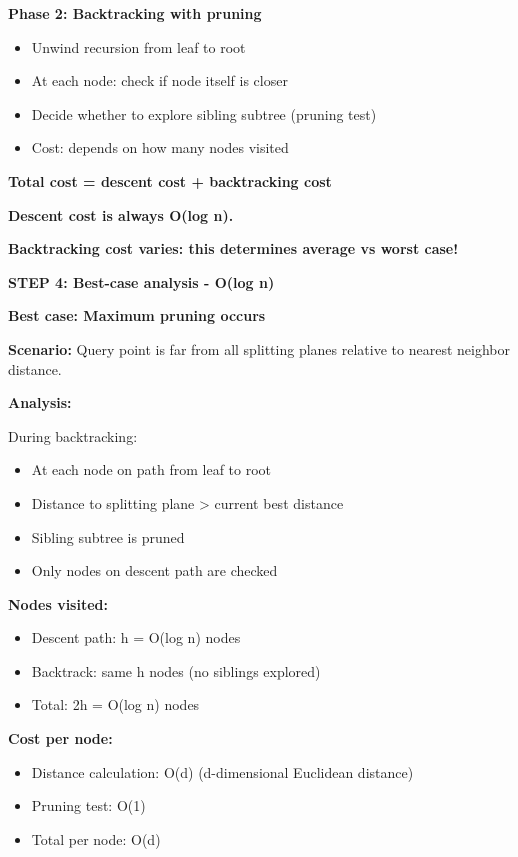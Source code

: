 \documentclass[12pt]{article}
\begin{document}
\begin{solution}
\textbf{Phase 2: Backtracking with pruning}
\begin{itemize}
    \item Unwind recursion from leaf to root
    \item At each node: check if node itself is closer
    \item Decide whether to explore sibling subtree (pruning test)
    \item Cost: depends on how many nodes visited
\end{itemize}

\textbf{Total cost = descent cost + backtracking cost}

\textbf{Descent cost is always O(log n).}

\textbf{Backtracking cost varies: this determines average vs worst case!}

\textbf{STEP 4: Best-case analysis - O(log n)}

\textbf{Best case: Maximum pruning occurs}

\textbf{Scenario:} Query point is far from all splitting planes relative to nearest neighbor distance.

\textbf{Analysis:}

During backtracking:
\begin{itemize}
    \item At each node on path from leaf to root
    \item Distance to splitting plane > current best distance
    \item Sibling subtree is pruned
    \item Only nodes on descent path are checked
\end{itemize}

\textbf{Nodes visited:}
\begin{itemize}
    \item Descent path: h = O(log n) nodes
    \item Backtrack: same h nodes (no siblings explored)
    \item Total: 2h = O(log n) nodes
\end{itemize}

\textbf{Cost per node:}
\begin{itemize}
    \item Distance calculation: O(d) (d-dimensional Euclidean distance)
    \item Pruning test: O(1)
    \item Total per node: O(d)
\end{itemize}


\end{solution}
\end{document}
